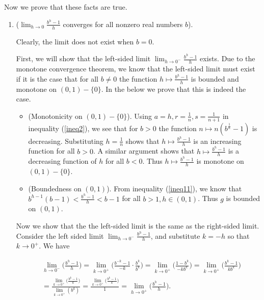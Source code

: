 \vspace{.25cm}

Now we prove that these facts are true.

\begin{enumerate}
    \item ($\lim_{h \rightarrow 0} \frac{b^h - 1}{h}$ converges for all nonzero real numbers $b$).
    
    Clearly, the limit does not exist when $b = 0$. 
        
    First, we will show that the left-sided limit $\lim_{h \rightarrow 0^-} \frac{b^h - 1}{h}$ exists. Due to the monotone convergence theorem, we know that the left-sided limit must exist if it is the case that for all $b \neq 0$ the function $h \mapsto \frac{b^h - 1}{h}$ is bounded and monotone on $(0, 1) - \{0\}$. In the below we prove that this is indeed the case.
    
    \begin{itemize}
        \item (Monotonicity on $(0, 1) - \{0\}$). Using $a = h, r = \frac{1}{n}, s = \frac{1}{n + 1}$ in inequality (\ref{ineq2}), we see that for $b > 0$ the function $n \mapsto n(b^{\frac{1}{n}} - 1)$ is decreasing. Substituting $h = \frac{1}{n}$ shows that $h \mapsto \frac{b^h - 1}{h}$ is an increasing function for all $b > 0$. A similar argument shows that $h \mapsto \frac{b^h - 1}{h}$ is a decreasing function of $h$ for all $b < 0$. Thus $h \mapsto \frac{b^h - 1}{h}$ is monotone on $(0, 1) - \{0\}$.
        \item (Boundedness on $(0, 1)$). From inequality (\ref{ineq11}), we know that $b^{h - 1}(b - 1) < \frac{b^h - 1}{h} < b - 1$ for all $b > 1, h \in (0, 1)$. Thus $g$ is bounded on $(0, 1)$.
    \end{itemize}
    
    Now we show that the the left-sided limit is the same as the right-sided limit. Consider the left sided limit $\lim_{h \rightarrow 0^-} \frac{b^h - 1}{h}$, and substitute $k = -h$ so that $k \rightarrow 0^+$. We have
    
    \begin{align*}
        &\lim_{h \rightarrow 0^-} \Big( \frac{b^h - 1}{h} \Big) 
        = \lim_{k \rightarrow 0^+} \Big( \frac{b^{-k} - 1}{-k} \cdot \frac{b^k}{b^k} \Big) 
        = \lim_{k \rightarrow 0^+} \Big( \frac{1 - b^k}{-kb^k} \Big)
        = \lim_{k \rightarrow 0^+} \Big( \frac{b^k - 1}{kb^k} \Big) \\ 
        &= \frac{\lim_{k \rightarrow 0^+} \Big( \frac{b^k - 1}{k} \Big)}{\lim_{k \rightarrow 0^+} (b^k)}
        = \frac{\lim_{k \rightarrow 0^+} \Big( \frac{b^k - 1}{k} \Big)}{1}
        = \lim_{h \rightarrow 0^+} \Big( \frac{b^h - 1}{h} \Big).
    \end{align*}
    

\end{enumerate}
